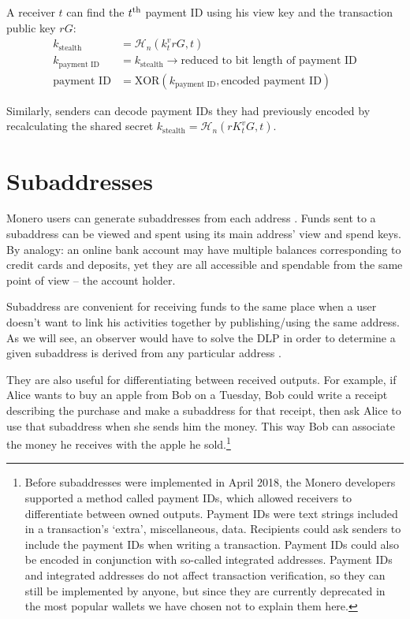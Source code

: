 A receiver $t$ can find the $t\textsuperscript{th}$ payment ID using his view key and the transaction public key $r G$: \\
\begin{align*}
         k_{\textrm{stealth}} &= \mathcal{H}_n(k_t^v r G, t) \\
      k_{\textrm{payment ID}} &= k_{\textrm{stealth}} \rightarrow \textrm{reduced to bit length of payment ID}\\
          \textrm{payment ID} &= \textrm{XOR}(k_{\textrm{payment ID}}, \textrm{encoded payment ID})
\end{align*}

Similarly, senders can decode payment IDs they had previously encoded by recalculating the shared secret $k_{\textrm{stealth}} = \mathcal{H}_n(r K_t^v G, t)$.
\fi

\section{Subaddresses}
\label{sec:subaddresses}

Monero users can generate subaddresses from each address \cite{MRL-0006}. Funds sent to a subaddress can be viewed and spent using its main address’ view and spend keys. By analogy: an online bank account may have multiple balances corresponding to credit cards and deposits, yet they are all accessible and spendable from the same point of view – the account holder.

Subaddress are convenient for receiving funds to the same place when a user doesn’t want to link his activities together by publishing/using the same address. As we will see, an observer would have to solve the DLP in order to determine a given subaddress is derived from any particular address \cite{MRL-0006}.

They are also useful for differentiating between received outputs. For example, if Alice wants to buy an apple from Bob on a Tuesday, Bob could write a receipt describing the purchase and make a subaddress for that receipt, then ask Alice to use that subaddress when she sends him the money. This way Bob can associate the money he receives with the apple he sold.\footnote{Before subaddresses were implemented in April 2018, the Monero developers supported a method called payment IDs, which allowed receivers to differentiate between owned outputs. Payment IDs were text strings included in a transaction's `extra', miscellaneous, data. Recipients could ask senders to include the payment IDs when writing a transaction. Payment IDs could also be encoded in conjunction with so-called integrated addresses. Payment IDs and integrated addresses do not affect transaction verification, so they can still be implemented by anyone, but since they are currently deprecated in the most popular wallets we have chosen not to explain them here.}

